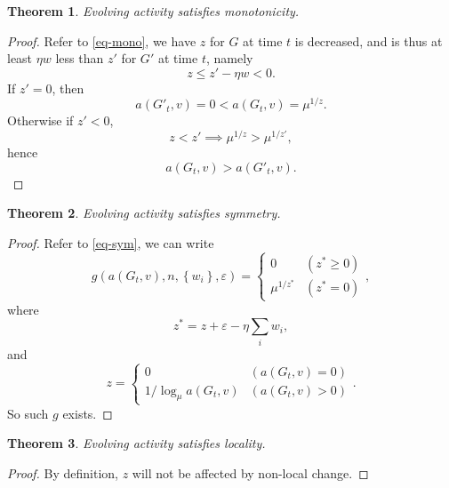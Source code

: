 \documentclass[12pt,abstract=true]{scrartcl}
\numberwithin{equation}{section}
\theoremstyle{definition}   \newtheorem{definition}{Definition}[section]
\theoremstyle{plain}        \newtheorem{theorem}{Theorem}[section]
\theoremstyle{plain}        \newtheorem{observation}{Observation}[section]
\theoremstyle{plain}        \newtheorem{fact}{Fact}[section]
\theoremstyle{plain}        \newtheorem{claim}{Claim}[section]
\theoremstyle{plain}        \newtheorem{lemma}[theorem]{Lemma}
\theoremstyle{plain}        \newtheorem{corollary}[theorem]{Corollary}
\theoremstyle{remark}       \newtheorem{example}{Example}[section]
\theoremstyle{remark}       \newtheorem{remark}{Remark}[section]
\begin{document}
\begin{theorem}
Evolving activity satisfies monotonicity.
\end{theorem}
\begin{proof}
Refer to \eqref{eq-mono}, we have $z$ for $G$ at time $t$ is decreased, and
is thus at least $\eta w$ less than $z'$ for $G'$ at time $t$, namely
\begin{equation}z\leq z'-\eta w<0.\end{equation}
If $z'=0$, then
\begin{equation}
a(G'_t,v)=0<a(G_t,v)=\mu^{1/z}.
\end{equation}
Otherwise if $z'<0$,
\begin{equation}
z<z'\implies \mu^{1/z}>\mu^{1/z'},
\end{equation}
hence
\begin{equation}
a(G_t,v)>a(G'_t,v).
\end{equation}
\end{proof}

\begin{theorem}
Evolving activity satisfies symmetry.
\end{theorem}
\begin{proof}
Refer to \eqref{eq-sym}, we can write
\begin{equation}
g(a(G_t,v),n,\left\{w_i\right\},\varepsilon)=\begin{cases}
0 &(z^*\geq 0)\\
\mu^{1/z^*}& (z^*=0)
\end{cases},
\end{equation}
where
\begin{equation}
z^*=z+\varepsilon-\eta \sum_i w_i,
\end{equation}
and
\begin{equation}
z=\begin{cases}
0&(a(G_t,v)=0)\\
1/\log_{\mu}a(G_t,v)&(a(G_t,v)>0)
\end{cases}.
\end{equation}
So such $g$ exists.
\end{proof}

\begin{theorem}
Evolving activity satisfies locality.
\end{theorem}
\begin{proof}
By definition, $z$ will not be affected by non-local change.
\end{proof}
\end{document}
